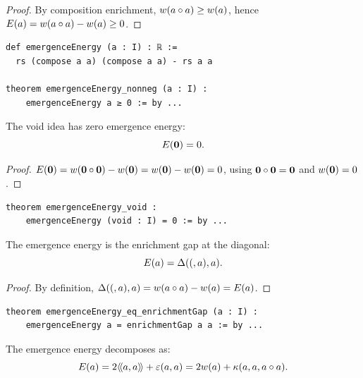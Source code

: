 \begin{proof}
By composition enrichment, $w(a \circ a) \geq w(a)$, hence
$E(a) = w(a \circ a) - w(a) \geq 0$.
\end{proof}

\begin{lstlisting}[caption={Emergence energy (IDT\_v3\_Emergence.lean)}]
def emergenceEnergy (a : I) : ℝ :=
  rs (compose a a) (compose a a) - rs a a

theorem emergenceEnergy_nonneg (a : I) :
    emergenceEnergy a ≥ 0 := by ...
\end{lstlisting}

\begin{theorem}
\label{thm:void-zero-energy}
The void idea has zero emergence energy:
\[
  E(\mathbf{0}) = 0.
\]
\end{theorem}

\begin{proof}
$E(\mathbf{0}) = w(\mathbf{0} \circ \mathbf{0}) - w(\mathbf{0}) = w(\mathbf{0}) - w(\mathbf{0}) = 0$,
using $\mathbf{0} \circ \mathbf{0} = \mathbf{0}$ and $w(\mathbf{0}) = 0$.
\end{proof}

\begin{lstlisting}[caption={Void energy (IDT\_v3\_Emergence.lean)}]
theorem emergenceEnergy_void :
    emergenceEnergy (void : I) = 0 := by ...
\end{lstlisting}

\begin{theorem}
\label{thm:energy-eq-gap}
The emergence energy is the enrichment gap at the diagonal:
\[
  E(a) = \Delta((,a), a).
\]
\end{theorem}

\begin{proof}
By definition, $\Delta((,a),a) = w(a \circ a) - w(a) = E(a)$.
\end{proof}

\begin{lstlisting}[caption={Energy as gap (IDT\_v3\_Emergence.lean)}]
theorem emergenceEnergy_eq_enrichmentGap (a : I) :
    emergenceEnergy a = enrichmentGap a a := by ...
\end{lstlisting}

\begin{theorem}
\label{thm:energy-decomposition}
The emergence energy decomposes as:
\[
  E(a) = 2\langle\!\langle a, a \rangle\!\rangle + \varepsilon(a,a) = 2w(a) + \kappa(a,a,a \circ a).
\]
\end{theorem}

